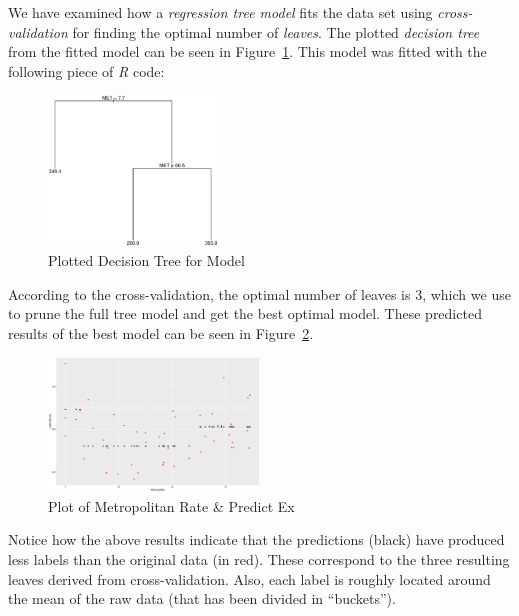 \documentclass[a4paper, twocolumn]{article}
\begin{document}
        We have examined how a \emph{regression tree model} fits the data set using \emph{cross-validation} for finding the optimal number of \emph{leaves}. The plotted \emph{decision tree} from the fitted model can be seen in Figure~\ref{fig:tree}. This model was fitted with the following piece of \emph{R} code:

        

        \begin{figure}[h!]
            \centering
            \caption{Plotted Decision Tree for Model}
            \label{fig:tree}
            \includegraphics[width=0.4\textwidth]{share/A1_tree.eps}
        \end{figure}

        According to the cross-validation, the optimal number of leaves is 3, which we use to prune the full tree model and get the best optimal model. These predicted results of the best model can be seen in Figure~\ref{fig:predicted}.

        \begin{figure}[h!]
            \centering
            \caption{Plot of Metropolitan Rate \& Predict Ex}
            \label{fig:predicted}
            \includegraphics[width=0.5\textwidth]{share/A1_fit.eps}
        \end{figure}

        Notice how the above results indicate that the predictions (black) have produced less labels than the original data (in red). These correspond to the three resulting leaves derived from cross-validation. Also, each label is roughly located around the mean of the raw data (that has been divided in ``buckets'').
\end{document}
